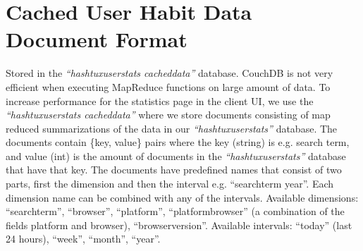 \section{Cached User Habit Data Document Format}
Stored in the \textit{``hashtux\textunderscore userstats\textunderscore
cached\textunderscore data''} database. \newline
CouchDB is not very efficient when executing MapReduce functions on large amount
of data. To increase performance for the statistics page in the client UI, we
use the \textit{``hashtux\textunderscore userstats\textunderscore
cached\textunderscore data''} where we store documents consisting of map reduced
summarizations of the data in our \textit{``hashtux\textunderscore userstats''}
database. The documents contain \{key, value\} pairs where the key (string) is
e.g. search term, and value (int) is the amount of documents in the
\textit{``hashtux\textunderscore userstats''} database that have that key.
\newline
The documents have predefined names that consist of two parts, first the
dimension and then the interval e.g. ``search\textunderscore term\textunderscore
year''.  Each dimension name can be combined with any of the intervals.\newline
Available dimensions: ``search\textunderscore term'', ``browser'', ``platform'',
``platform\textunderscore browser'' (a combination of the fields platform and
browser), ``browser\textunderscore version''. \newline
Available intervals: ``today'' (last 24 hours), ``week'', ``month'', ``year''.